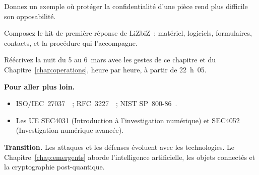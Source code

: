 \begin{boxexo}[title={\ding{45}\quad Exercice~24.8. CRO \niveaumoyen}]
Donnez un exemple où protéger la confidentialité d'une pièce rend plus
difficile son opposabilité.
\end{boxexo}

\begin{boxexo}[title={\ding{45}\quad Exercice~24.9. Le kit \niveauexpert}]
Composez le kit de première réponse de LiZbiZ~: matériel, logiciels,
formulaires, contacts, et la procédure qui l'accompagne.
\end{boxexo}

\begin{boxexo}[title={\ding{45}\quad Exercice~24.10. Réécrire la nuit \niveauexpert}]
Réécrivez la nuit du 5 au 6~mars avec les gestes de ce chapitre et du
Chapitre~\ref{chap:operations}, heure par heure, à partir de 22~h~05.
\end{boxexo}

\bigskip

\begin{boxinfo}
\textbf{Pour aller plus loin.}
\begin{itemize}
    \item ISO/IEC~27037~\cite{iso27037}~; RFC~3227~\cite{rfc3227}~; NIST
          SP~800-86~\cite{nist80086}.
    \item Les UE SEC4031 (Introduction à l'investigation numérique) et
          SEC4052 (Investigation numérique avancée).
\end{itemize}
\end{boxinfo}

\begin{boxinfo}
\textbf{Transition.} Les attaques et les défenses évoluent avec les
technologies. Le Chapitre~\ref{chap:emergents} aborde l'intelligence
artificielle, les objets connectés et la cryptographie post-quantique.
\end{boxinfo}
